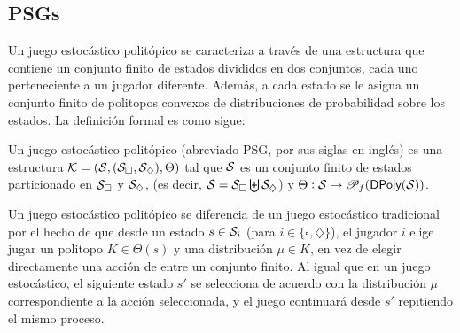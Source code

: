 
\subsection*{PSGs}


Un juego estocástico politópico se caracteriza a través de una estructura que
contiene un conjunto finito de estados divididos en dos conjuntos, cada uno
perteneciente a un jugador diferente. Además, a cada estado se le asigna un
conjunto finito de politopos convexos de distribuciones de probabilidad sobre
los estados. La definición formal es como sigue:

\begin{definition}[PSG]
	Un juego estocástico politópico (abreviado PSG, por sus siglas en inglés) es una estructura \( \mathcal{K} = (\mathcal{S}, (\mathcal{S}_\square, \mathcal{S}_\diamondsuit), \Theta) \) tal que \( \mathcal{S} \) es un conjunto finito de estados particionado en $\mathcal{S}_\square$ y $\mathcal{S}_\diamondsuit$, (es decir, \( \mathcal{S} = \mathcal{S}_\square \biguplus \mathcal{S}_\diamondsuit \)) y \( \Theta : \mathcal{S} \to \mathscr{P}_f(\textsf{DPoly}(\mathcal{S})) \).
\end{definition}

Un juego estocástico politópico se diferencia de un juego estocástico
tradicional por el hecho de que desde un estado \( s \in \mathcal{S}_i \) (para \( i
\in \{ \square, \diamondsuit \} \)), el jugador \( i \) elige jugar un politopo
\( K \in \Theta(s) \) y una distribución \( \mu \in K \), en vez de elegir
directamente una acción de entre un conjunto finito. Al igual que en un juego
estocástico, el siguiente estado \( s' \) se selecciona de acuerdo con la
distribución \( \mu \) correspondiente a la acción seleccionada, y el juego
continuará desde \( s' \) repitiendo el mismo proceso.

